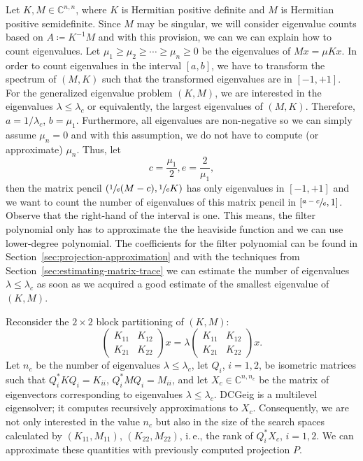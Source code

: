 \documentclass[%
	paper=a4,
	fontsize=10pt,
	DIV11,BCOR10mm,
	numbers=noenddot,
	abstract=yes
]{scrartcl}
\newcommand{\F}{\mathbb{C}}
\theoremstyle{definition}
\begin{document}
Let $K, M \in \F^{n,n}$, where $K$ is Hermitian positive definite and $M$ is
Hermitian positive semidefinite. Since $M$ may be singular, we will consider
eigenvalue counts based on $A \coloneqq K^{-1} M$ and with this provision, we
can we can explain how to count eigenvalues. Let $\mu_1 \geq \mu_2 \geq \dotsb
\geq \mu_n \geq 0$ be the eigenvalues of $M x = \mu K x$. In order to count
eigenvalues in the interval $[a, b]$, we have to transform the spectrum of $(M,
K)$ such that the transformed eigenvalues are in $[-1, +1]$. For the generalized
eigenvalue problem $(K, M)$, we are interested in the eigenvalues $\lambda \leq
\lambda_c$ or equivalently, the largest eigenvalues of $(M, K)$. Therefore, $a =
1/\lambda_c$, $b = \mu_1$. Furthermore, all eigenvalues are non-negative so we
can simply assume $\mu_n = 0$ and with this assumption, we do not have to
compute (or approximate) $\mu_n$. Thus, let
\[ c = \frac{\mu_1}{2}, e = \frac{2}{\mu_1}, \]
then the matrix pencil $(\sfrac{1}{e} (M-c), \sfrac{1}{e} K)$ has only
eigenvalues in $[-1, +1]$ and we want to count the number of eigenvalues of this
matrix pencil in $[\sfrac{a-c}{e}, 1]$. Observe that the right-hand of the
interval is one. This means, the filter polynomial only has to approximate the
the heaviside function and we can use lower-degree polynomial. The coefficients
for the filter polynomial can be found in
Section~\ref{sec:projection-approximation} and with the techniques from
Section~\ref{sec:estimating-matrix-trace} we can estimate the number of
eigenvalues $\lambda \leq \lambda_c$ as soon as we acquired a good estimate of
the smallest eigenvalue of $(K, M)$.

Reconsider the $2 \times 2$ block partitioning of $(K, M)$:
\[
	\begin{pmatrix} K_{11} & K_{12} \\ K_{21} & K_{22} \end{pmatrix}
	x
	= \lambda \begin{pmatrix} K_{11} & K_{12} \\ K_{21} & K_{22} \end{pmatrix}x.
\]
Let $n_c$ be the number of eigenvalues $\lambda \leq \lambda_c$, let $Q_i$, $i =
1, 2$, be isometric matrices such that $Q_i^* K Q_i = K_{ii}$, $Q_i^* M Q_i =
M_{ii}$, and let $X_c \in \F^{n,n_c}$ be the matrix of eigenvectors
corresponding to eigenvalues $\lambda \leq \lambda_c$. DCGeig is a multilevel
eigensolver; it computes recursively approximations to $X_c$. Consequently, we
are not only interested in the value $n_c$ but also in the size of the search
spaces calculated by $(K_{11}, M_{11})$, $(K_{22}, M_{22})$, i.\,e., the rank of
$Q_i^* X_c$, $i = 1, 2$. We can approximate these quantities with previously
computed projection $P$.
\end{document}
